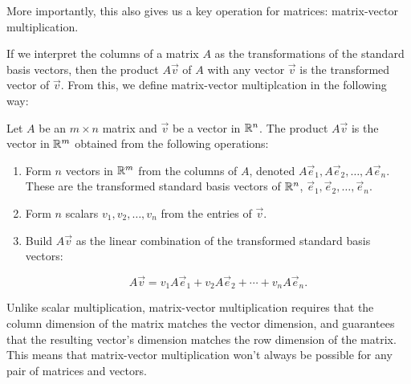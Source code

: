\documentclass{ximera}
\begin{document}
        More importantly, this also gives us a key operation for matrices: matrix-vector multiplication. 

        If we interpret the columns of a matrix $A$ as the transformations of the standard basis vectors, then the product $A\vec{v}$ of $A$ with any vector $\vec{v}$ is the transformed vector of $\vec{v}$. From this, we define matrix-vector multiplcation in the following way:

        \begin{definition}

            Let $A$ be an $m\times n$ matrix and $\vec{v}$ be a vector in $\mathbb{R}^n$. The product $A\vec{v}$ is the vector in $\mathbb{R}^m$ obtained from the following operations:
            
            \begin{enumerate}

                \item Form $n$ vectors in $\mathbb{R}^m$ from the columns of $A$, denoted $A\vec{e}_1, A\vec{e}_2, \ldots, A\vec{e}_n$. These are the transformed standard basis vectors of $\mathbb{R}^n$, $\vec{e}_1, \vec{e}_2, \ldots, \vec{e}_n$.
                
                \item Form $n$ scalars $v_1, v_2, \ldots, v_n$ from the entries of $\vec{v}$.
                
                \item Build $A\vec{v}$ as the linear combination of the transformed standard basis vectors:
                
                $$A\vec{v} = v_1A\vec{e}_1 + v_2A\vec{e}_2 + \cdots + v_nA\vec{e}_n.$$

            \end{enumerate}
        \end{definition}

        Unlike scalar multiplication, matrix-vector multiplication requires that the column dimension of the matrix matches the vector dimension, and guarantees that the resulting vector's dimension matches the row dimension of the matrix. This means that matrix-vector multiplication won't always be possible for any pair of matrices and vectors.
\end{document}
